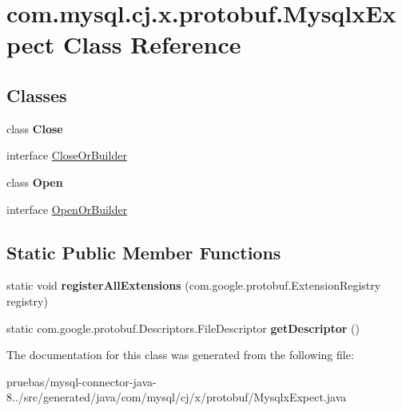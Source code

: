 \hypertarget{classcom_1_1mysql_1_1cj_1_1x_1_1protobuf_1_1_mysqlx_expect}{}\section{com.\+mysql.\+cj.\+x.\+protobuf.\+Mysqlx\+Expect Class Reference}
\label{classcom_1_1mysql_1_1cj_1_1x_1_1protobuf_1_1_mysqlx_expect}
\subsection*{Classes}
\begin{DoxyCompactItemize}
\item 
class {\bfseries Close}
\item 
interface \mbox{\hyperlink{interfacecom_1_1mysql_1_1cj_1_1x_1_1protobuf_1_1_mysqlx_expect_1_1_close_or_builder}{Close\+Or\+Builder}}
\item 
class {\bfseries Open}
\item 
interface \mbox{\hyperlink{interfacecom_1_1mysql_1_1cj_1_1x_1_1protobuf_1_1_mysqlx_expect_1_1_open_or_builder}{Open\+Or\+Builder}}
\end{DoxyCompactItemize}
\subsection*{Static Public Member Functions}
\begin{DoxyCompactItemize}
\item 
\mbox{\label{classcom_1_1mysql_1_1cj_1_1x_1_1protobuf_1_1_mysqlx_expect_ad11f0acd1644efca1f4e418da0d17e3c}} 
static void {\bfseries register\+All\+Extensions} (com.\+google.\+protobuf.\+Extension\+Registry registry)
\item 
\mbox{\label{classcom_1_1mysql_1_1cj_1_1x_1_1protobuf_1_1_mysqlx_expect_a6070b9425234aa5620af2d6df91eb9d7}} 
static com.\+google.\+protobuf.\+Descriptors.\+File\+Descriptor {\bfseries get\+Descriptor} ()
\end{DoxyCompactItemize}


The documentation for this class was generated from the following file\+:\begin{DoxyCompactItemize}
\item 
pruebas/mysql-\/connector-\/java-\/8../src/generated/java/com/mysql/cj/x/protobuf/Mysqlx\+Expect.\+java\end{DoxyCompactItemize}
